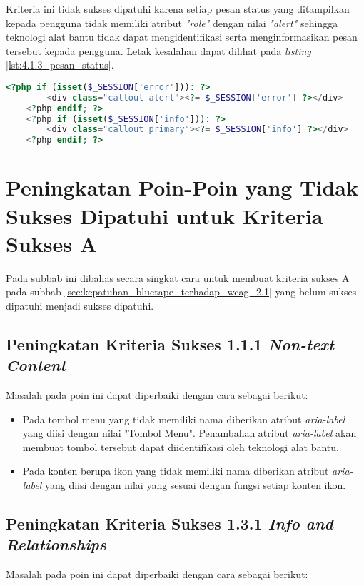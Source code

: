 Kriteria ini tidak sukses dipatuhi karena setiap pesan status yang ditampilkan kepada pengguna tidak memiliki atribut \textit{"role"} dengan nilai \textit{"alert"} sehingga teknologi alat bantu tidak dapat mengidentifikasi serta menginformasikan pesan tersebut kepada pengguna. Letak kesalahan dapat dilihat pada \textit{listing} \ref{lst:4.1.3_pesan_status}.

\begin{lstlisting}[frame=single, label={lst:4.1.3_pesan_status}, language=PHP, caption=Pelanggaran Kriteria Sukses 4.1.3 pada Bagian Pesan Status]
    <?php if (isset($_SESSION['error'])): ?>
        <div class="callout alert"><?= $_SESSION['error'] ?></div>
    <?php endif; ?>
    <?php if (isset($_SESSION['info'])): ?>
        <div class="callout primary"><?= $_SESSION['info'] ?></div>
    <?php endif; ?>
\end{lstlisting}

\section{Peningkatan Poin-Poin yang Tidak Sukses Dipatuhi untuk Kriteria Sukses A}
\label{sec:peningkatan_kriteria_sukses_a}
Pada subbab ini dibahas secara singkat cara untuk membuat kriteria sukses A pada subbab \ref{sec:kepatuhan_bluetape_terhadap_wcag_2.1} yang belum sukses dipatuhi menjadi sukses dipatuhi.

\subsection{Peningkatan Kriteria Sukses 1.1.1 \textit{Non-text Content}}
\label{subsec:peningkatan_kriteria_sukses_1.1.1}
Masalah pada poin ini dapat diperbaiki dengan cara sebagai berikut: 

\begin{itemize}
    \item Pada tombol menu yang tidak memiliki nama diberikan atribut \textit{aria-label} yang diisi dengan nilai "Tombol Menu". Penambahan atribut \textit{aria-label} akan membuat tombol tersebut dapat diidentifikasi oleh teknologi alat bantu.
    \item Pada konten berupa ikon yang tidak memiliki nama diberikan atribut \textit{aria-label} yang diisi dengan nilai yang sesuai dengan fungsi setiap konten ikon.
\end{itemize}

\subsection{Peningkatan Kriteria Sukses 1.3.1 \textit{Info and Relationships}}
\label{subsec:peningkatan_kriteria_sukses_1.3.1}
Masalah pada poin ini dapat diperbaiki dengan cara sebagai berikut:

